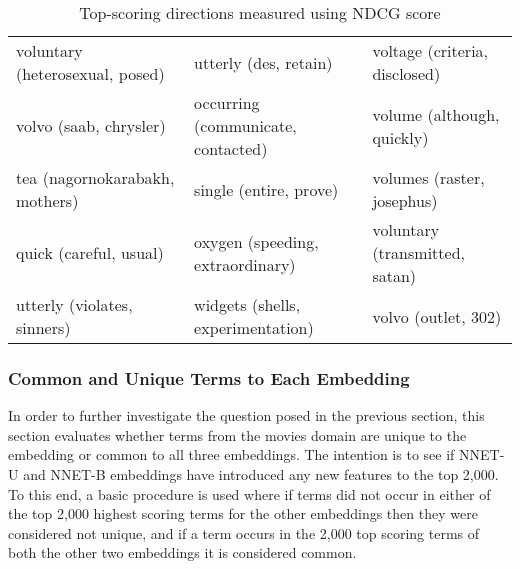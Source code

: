 \begin{table}[]
\begin{tabular}{lll}
		voluntary (heterosexual, posed)          & utterly (des, retain)                             & voltage (criteria, disclosed)                            \\
		volvo (saab, chrysler)                   & occurring (communicate, contacted)                & volume (although, quickly)                               \\
		tea (nagornokarabakh, mothers)           & single (entire, prove)                            & volumes (raster, josephus)                               \\
		quick (careful, usual)                   & oxygen (speeding, extraordinary)                  & voluntary (transmitted, satan)                           \\
		utterly (violates, sinners)              & widgets (shells, experimentation)                 & volvo (outlet, 302)                                     
	\end{tabular}\caption{Top-scoring directions measured using NDCG score}\label{ch5:topscores}
\end{table}

\subsubsection{Common and Unique Terms to Each Embedding}\label{ch5:commonunique}

In order to further investigate the question posed in the previous section, this section evaluates whether terms from the movies domain are unique to the embedding or common to all three embeddings. The intention is to see if NNET-U and NNET-B embeddings have introduced any new features to the top 2,000. To this end,  a basic procedure is used  where if terms did not occur in either of the top 2,000 highest scoring terms for the other embeddings then they were considered not unique, and if a term  occurs in the 2,000 top scoring terms of both the other two embeddings it is considered common. 

